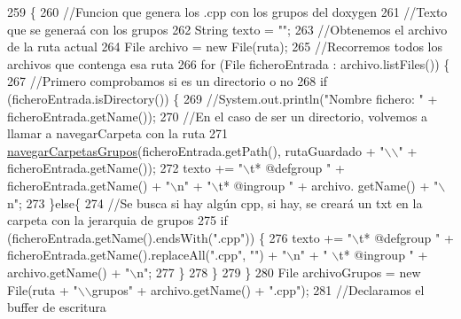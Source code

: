 \begin{DoxyCode}
259                                                                         \{
260         \textcolor{comment}{//Funcion que genera los .cpp con los grupos del doxygen}
261         \textcolor{comment}{//Texto que se generaá con los grupos}
262         String texto = \textcolor{stringliteral}{""};
263         \textcolor{comment}{//Obtenemos el archivo de la ruta actual}
264         File archivo = \textcolor{keyword}{new} File(ruta);
265         \textcolor{comment}{//Recorremos todos los archivos que contenga esa ruta}
266         \textcolor{keywordflow}{for} (File ficheroEntrada : archivo.listFiles()) \{
267             \textcolor{comment}{//Primero comprobamos si es un directorio o no}
268             \textcolor{keywordflow}{if} (ficheroEntrada.isDirectory()) \{
269                 \textcolor{comment}{//System.out.println("Nombre fichero: " + ficheroEntrada.getName());}
270                 \textcolor{comment}{//En el caso de ser un directorio, volvemos a llamar a navegarCarpeta con la ruta}
271                 \mbox{\hyperlink{classactualizadordoxy_1_1_actualizador_doxy_a483f64d7ea713784694962feed55f4f4}{navegarCarpetasGrupos}}(ficheroEntrada.getPath(), rutaGuardado + \textcolor{stringliteral}{"\(\backslash\)\(\backslash\)"} + 
      ficheroEntrada.getName());
272                 texto += \textcolor{stringliteral}{"\(\backslash\)t*  @defgroup "} + ficheroEntrada.getName() + \textcolor{stringliteral}{"\(\backslash\)n"} + \textcolor{stringliteral}{"\(\backslash\)t*  @ingroup "} + archivo.
      getName() + \textcolor{stringliteral}{"\(\backslash\)n"};
273             \}\textcolor{keywordflow}{else}\{
274                 \textcolor{comment}{//Se busca si hay algún cpp, si hay, se creará un txt en la carpeta con la jerarquia de
       grupos}
275                 \textcolor{keywordflow}{if} (ficheroEntrada.getName().endsWith(\textcolor{stringliteral}{".cpp"})) \{
276                     texto += \textcolor{stringliteral}{"\(\backslash\)t*  @defgroup "} + ficheroEntrada.getName().replaceAll(\textcolor{stringliteral}{".cpp"}, \textcolor{stringliteral}{""}) + \textcolor{stringliteral}{"\(\backslash\)n"} + \textcolor{stringliteral}{"
      \(\backslash\)t*  @ingroup "} + archivo.getName() + \textcolor{stringliteral}{"\(\backslash\)n"};
277                 \}
278             \}
279         \}
280         File archivoGrupos = \textcolor{keyword}{new} File(ruta + \textcolor{stringliteral}{"\(\backslash\)\(\backslash\)grupos"} + archivo.getName() + \textcolor{stringliteral}{".cpp"});
281         \textcolor{comment}{//Declaramos el buffer de escritura}

\end{DoxyCode}
